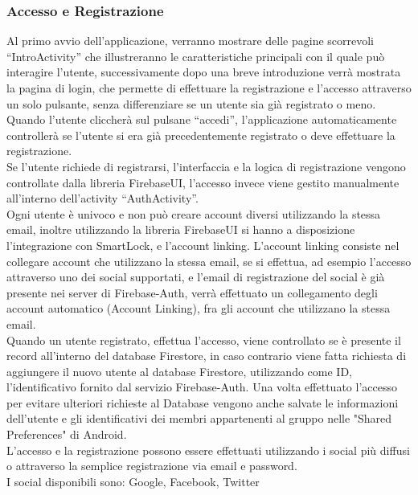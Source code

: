 \subsubsection{Accesso e Registrazione}
Al primo avvio dell'applicazione, verranno mostrare delle pagine scorrevoli ``IntroActivity'' che illustreranno le caratteristiche principali con il quale può interagire l'utente, successivamente dopo una breve introduzione verrà mostrata la pagina di login, che permette di effettuare la registrazione e l'accesso attraverso un solo pulsante, senza differenziare se un utente sia già registrato o meno.\\
Quando l'utente cliccherà sul pulsane ``accedi'', l'applicazione automaticamente controllerà se l'utente si era già precedentemente registrato o deve effettuare la registrazione.\\
Se l'utente richiede di registrarsi, l'interfaccia e la logica di registrazione vengono controllate dalla libreria FirebaseUI, l'accesso invece viene gestito manualmente all'interno dell'activity ``AuthActivity''.\\
Ogni utente è univoco e non può creare account diversi utilizzando la stessa email, inoltre utilizzando la libreria FirebaseUI si hanno a disposizione l'integrazione con SmartLock, e l'account linking.
L'account linking consiste nel collegare account che utilizzano la stessa email, se si effettua, ad esempio l'accesso attraverso uno dei social supportati, e l'email di registrazione del social è già presente nei server di Firebase-Auth, verrà effettuato un collegamento degli account automatico (Account Linking), fra gli account che utilizzano la stessa email.\\
Quando un utente registrato, effettua l'accesso, viene controllato se è presente il record all'interno del database Firestore, in caso contrario viene fatta richiesta di aggiungere il nuovo utente al database Firestore, utilizzando come ID, l'identificativo fornito dal servizio Firebase-Auth. Una volta effettuato l'accesso per evitare ulteriori richieste al Database vengono anche salvate le informazioni dell'utente e gli identificativi dei membri appartenenti al gruppo nelle "Shared Preferences" di Android.\\
L'accesso e la registrazione possono essere effettuati utilizzando i social più diffusi o attraverso la semplice registrazione via email e password.\\
I social disponibili sono: Google, Facebook, Twitter

